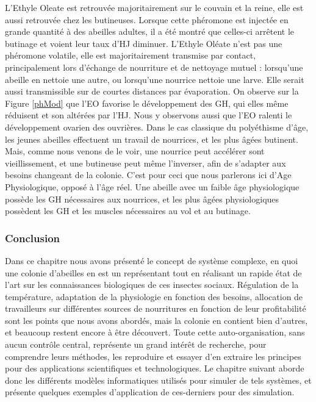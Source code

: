 			 L'Ethyle Oleate est retrouvée majoritairement sur le couvain et la reine, elle est aussi retrouvée chez les butineuses. Lorsque cette phéromone est injectée en grande quantité à des abeilles adultes, il a été montré que celles-ci arrêtent le butinage et voient leur taux d'HJ diminuer. L'Ethyle Oléate n'est pas une phéromone volatile, elle est majoritairement transmise par contact, principalement lors d'échange de nourriture et de nettoyage mutuel : lorsqu'une abeille en nettoie une autre, ou lorsqu'une nourrice nettoie une larve. Elle serait aussi transmissible sur de courtes distances par évaporation. On observe sur la Figure \ref{phMod} que l'EO favorise le développement des GH, qui elles même réduisent et son altérées par l'HJ. Nous y observons aussi que l'EO ralenti le développement ovarien des ouvrières. Dans le cas classique du polyéthisme d'âge, les jeunes abeilles effectuent un travail de nourrices, et les plus âgées butinent. Mais, comme nous venons de le voir, une nourrice peut accélérer sont vieillissement, et une butineuse peut même l'inverser, afin de s'adapter aux besoins changeant de la colonie. C'est pour ceci que nous parlerons ici d'Age Physiologique, opposé à l'âge réel. Une abeille avec un faible âge physiologique possède les GH nécessaires aux nourrices, et les plus âgées physiologiques possèdent les GH et les muscles nécessaires au vol et au butinage.
			
		\subsubsection{Conclusion}
			
		Dans ce chapitre nous avons présenté le concept de système complexe, en quoi une colonie d'abeilles en est un représentant tout en réalisant un rapide état de l'art sur les connaissances biologiques de ces insectes sociaux. Régulation de la température, adaptation de la physiologie en fonction des besoins, allocation de travailleurs sur différentes sources de nourritures en fonction de leur profitabilité sont les points que nous avons abordés, mais la colonie en contient bien d'autres, et beaucoup restent encore à être découvert. Toute cette auto-organisation, sans aucun contrôle central, représente un grand intérêt de recherche, pour comprendre leurs méthodes, les reproduire et essayer d'en extraire les principes pour des applications scientifiques et technologiques. Le chapitre suivant aborde donc les différents modèles informatiques utilisés pour simuler de tels systèmes, et présente quelques exemples d'application de ces-derniers pour des simulation.